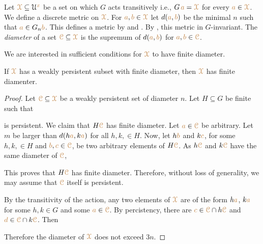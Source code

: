 Let $\mrX\subseteq\U^{\mr x}$ be a set on which $G$ acts transitively i.e., $G\,{\mr a}=\mrX$ for every ${\mr a}\in\mrX$.
We define a discrete metric on $\mrX$. 
For ${\mr a},{\mr b}\in\mrX$ let $d({\mr a},{\mr b})$ be the minimal $n$ such that ${\mr a}\in G_n{\mr b}$.
This defines a metric by  and .
By , this metric in $G$-invariant.
The \emph{diameter\/} of a set $\mrC\subseteq\mrX$ is the supremum of $d({\mr a},{\mr b})$ for ${\mr a},{\mr b}\in\mrC$.

We are interested in sufficient conditions for $\mrX$ to have finite diameter.

\begin{proposition}
  If $\mrX$ has a weakly persistent subset with finite diameter, then $\mrX$ has finite diamenter.
\end{proposition}

\begin{proof}
  Let $\mrC\subseteq\mrX$ be a weakly persistent set of diameter $n$.
  Let $H\subseteq G$ be finite such that 


  is persistent.
  We claim that $H\mrC$ has finite diameter.
  Let ${\mr a}\in\mrC$ be arbitrary.
  Let $m$ be larger than $d(h{\mr a}, k{\mr a})$ for all $h,k,\in H$.
  Now, let $h{\mr b}$ and $k{\mr c}$, for some $h,k,\in H$ and ${\mr b},{\mr c}\in\mrC$, be two arbitrary elements of $H\mrC$.
  As $h\mrC$ and $k\mrC$ have the same diameter of $\mrC$, 



  This proves that $H\mrC$ has finite diameter.
  Therefore, without loss of generality, we may assume that $\mrC$ itself is persistent.
  
  By the transitivity of the action, any two elements of $\mrX$ are of the form $h{\mr a}$, $k{\mr a}$ for some $h,k\in G$ and some ${\mr a}\in\mrC$.
  By percistency, there are ${\mr c}\in\mrC\cap h\mrC$ and ${\mr d}\in\mrC\cap k\mrC$.
  Then 



  Therefore the diameter of $\mrX$ does not exceed $3n$.
\end{proof}


